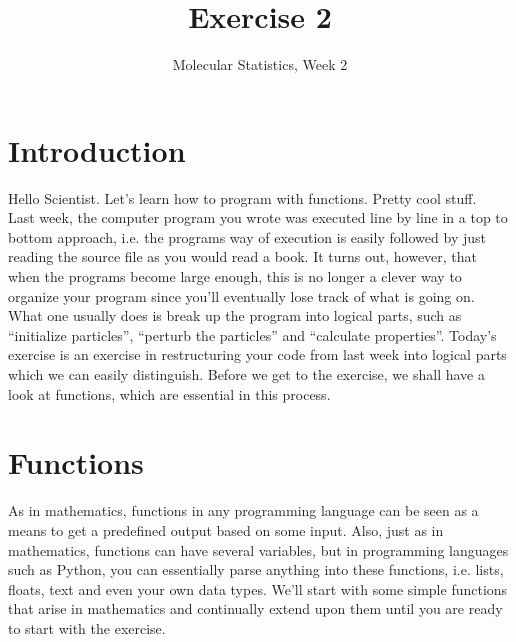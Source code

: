 \documentclass{article}
\title{Exercise 2}
\author{Molecular Statistics, Week 2}
\date{}
\begin{document}

\maketitle

\section{Introduction}

Hello Scientist. Let's learn how to program with functions. Pretty cool stuff.\\

Last week, the computer program you wrote was executed line by line in a top to bottom approach, i.e. the programs way of execution is easily followed by just reading the source file as you would read a book.
%
It turns out, however, that when the programs become large enough, this is no longer a clever way to organize your program since you'll eventually lose track of what is going on.
What one usually does is break up the program into logical parts, such as “initialize particles”, “perturb the particles” and “calculate properties”.
Today's exercise is an exercise in restructuring your code from last week into logical parts which we can easily distinguish.
Before we get to the exercise, we shall have a look at functions, which are essential in this process.\\


\newpage
\section{Functions}





As in mathematics, functions in any programming language can be seen as a means to get a predefined output based on some input.
Also, just as in mathematics, functions can have several variables, but in programming languages
such as Python, you can essentially parse anything into these functions, i.e. lists, floats, text and even your own data types.
We'll start with some simple functions that arise in mathematics and continually extend upon them until you are ready to start with the exercise.\\
\end{document}
